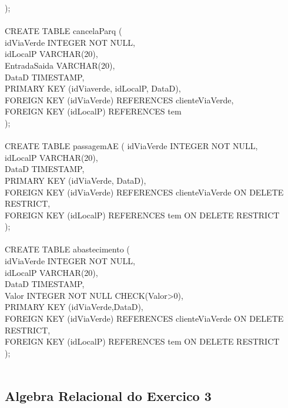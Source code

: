 \documentclass[a4paper]{article}
\begin{document}
);\\
\\
CREATE TABLE cancelaParq (\\
idViaVerde INTEGER NOT NULL,\\
idLocalP VARCHAR(20),\\
EntradaSaida VARCHAR(20),\\
DataD TIMESTAMP,\\
PRIMARY KEY (idViaverde, idLocalP, DataD),\\
FOREIGN KEY (idViaVerde) REFERENCES clienteViaVerde,\\
FOREIGN KEY (idLocalP) REFERENCES tem\\
);\\
\\
\newpage
\noindent CREATE TABLE passagemAE (
idViaVerde INTEGER NOT NULL,\\
idLocalP VARCHAR(20),\\
DataD TIMESTAMP,\\
PRIMARY KEY (idViaVerde, DataD),\\
FOREIGN KEY (idViaVerde) REFERENCES clienteViaVerde ON DELETE RESTRICT,\\
FOREIGN KEY (idLocalP) REFERENCES tem ON DELETE RESTRICT\\
);\\
\\
CREATE TABLE abastecimento (\\
idViaVerde INTEGER NOT NULL,\\
idLocalP VARCHAR(20),\\
DataD TIMESTAMP,\\
Valor INTEGER NOT NULL CHECK(Valor>0),\\
PRIMARY KEY (idViaVerde,DataD),\\
FOREIGN KEY (idViaVerde) REFERENCES clienteViaVerde ON DELETE RESTRICT,\\
FOREIGN KEY (idLocalP) REFERENCES tem ON DELETE RESTRICT\\
);\\
\\
\newpage
\subsection{Algebra Relacional  do Exercico 3}
\end{document}

